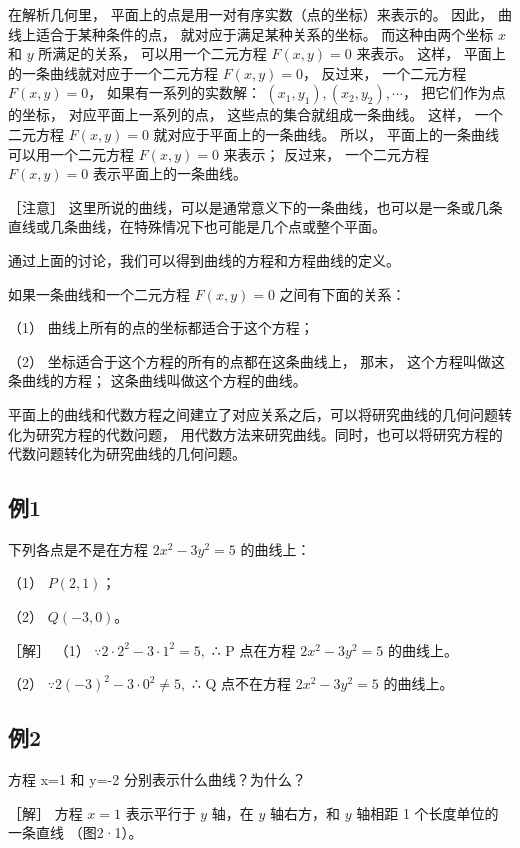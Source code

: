 在解析几何里， 平面上的点是用一对有序实数（点的坐标）来表示的。 因此，
曲线上适合于某种条件的点， 就对应于满足某种关系的坐标。 而这种由两个坐标
\(x\) 和 \(y\) 所满足的关系， 可以用一个二元方程 \(F(x, y) = 0\)
来表示。 这样， 平面上的一条曲线就对应于一个二元方程 \(F(x, y) = 0\)，
反过来， 一个二元方程 \(F(x, y) = 0\)， 如果有一系列的实数解：
\((x_1, y_1), (x_2, y_2), \cdots\)， 把它们作为点的坐标，
对应平面上一系列的点， 这些点的集合就组成一条曲线。 这样， 一个二元方程
\(F(x, y) = 0\) 就对应于平面上的一条曲线。 所以，
平面上的一条曲线可以用一个二元方程 \(F(x, y) = 0\) 来表示； 反过来，
一个二元方程 \(F(x, y) = 0\) 表示平面上的一条曲线。

［注意］
这里所说的曲线，可以是通常意义下的一条曲线，也可以是一条或几条直线或几条曲线，在特殊情况下也可能是几个点或整个平面。

通过上面的讨论，我们可以得到曲线的方程和方程曲线的定义。

如果一条曲线和一个二元方程 \(F(x, y) = 0\) 之间有下面的关系：

（1） 曲线上所有的点的坐标都适合于这个方程；

（2） 坐标适合于这个方程的所有的点都在这条曲线上， 那末，
这个方程叫做这条曲线的方程； 这条曲线叫做这个方程的曲线。

平面上的曲线和代数方程之间建立了对应关系之后，可以将研究曲线的几何问题转化为研究方程的代数问题，
用代数方法来研究曲线。同时，也可以将研究方程的代数问题转化为研究曲线的几何问题。

\subsection{例1}\label{ux4f8b1-7}

下列各点是不是在方程 \(2x^{2} - 3y^{2} = 5\) 的曲线上：

（1） \(P(2,1)\)；

（2） \(Q(-3,0)\)。

［解］ （1） \(\because 2 \cdot 2^{2} - 3 \cdot 1^{2} = 5,\) ∴ P
点在方程 \(2x^{2}-3y^{2}=5\) 的曲线上。

（2） \(\because 2(-3)^{2} - 3 \cdot 0^{2} \neq 5,\) ∴ Q 点不在方程
\(2x^{2}-3y^{2}=5\) 的曲线上。

\subsection{例2}\label{ux4f8b2-6}

方程 x=1 和 y=-2 分别表示什么曲线？为什么？

［解］ 方程 \(x = 1\) 表示平行于 \(y\) 轴，在 \(y\) 轴右方，和 \(y\)
轴相距 1 个长度单位的一条直线 （图2·1）。

